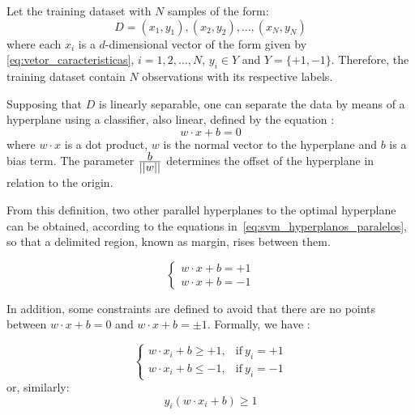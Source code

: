 Let the training dataset with $N$ samples of the form:
\begin{equation}
\label{eq:svm_dataset}
    D = (x_1, y_1), (x_2, y_2), \ldots, (x_N, y_N)
\end{equation}
\noindent where each $x_i$ is a $d$-dimensional vector of the form given by \ref{eq:vetor_caracteristicas}, $i = 1, 2, \ldots, N$, $y_i \in Y$ and $Y = \{+1, -1\}$. Therefore, the training dataset contain $N$ observations with its respective labels.

Supposing that $D$ is linearly separable, one can separate the data by means of a hyperplane using a classifier, also linear, defined by the equation \citep{lorena:03}:
\begin{equation}
\label{eq:svm_hyperplano_otimo}
w \cdot x + b = 0
\end{equation}
\noindent where $w \cdot x$ is a dot product, $w$ is the normal vector to the hyperplane and $b$ is a bias term. The parameter $\frac{\displaystyle b}{\displaystyle ||w||}$ determines the offset of the hyperplane in relation to the origin.

From this definition, two other parallel hyperplanes to the optimal hyperplane can be obtained, according to the equations in~\ref{eq:svm_hyperplanos_paralelos}, so that a delimited region, known as margin, rises between them.

\begin{equation}
\label{eq:svm_hyperplanos_paralelos}
\begin{cases}
    w \cdot x + b = +1\\
    w \cdot x + b = -1
\end{cases}
\end{equation}

In addition, some constraints are defined to avoid that there are no points between $w \cdot x + b = 0 $ and $w \cdot x + b = \pm 1$. Formally, we have \citep{lorena:03}:

\begin{equation}
\label{eq:svm_hyperplanos_paralelos_restricoes}
\begin{cases}
    w \cdot x_i + b \geq +1, & \text{if}\ y_i = +1\\
    w \cdot x_i + b \leq -1, & \text{if}\ y_i = -1
\end{cases}
\end{equation}
\noindent or, similarly:
\begin{equation}
\label{eq:svm_hyperplanos_paralelos_restricoes_equiv}
    y_i (w \cdot x_i + b) \geq 1
\end{equation}

